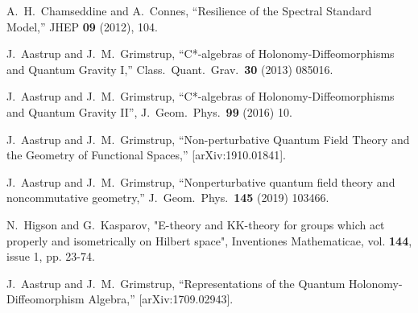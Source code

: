 \documentclass[letterpaper,11pt]{article}
\begin{document}
\begin{thebibliography}{99}
A.~H.~Chamseddine and A.~Connes,
``Resilience of the Spectral Standard Model,''
JHEP \textbf{09} (2012), 104.



  J.~Aastrup and J.~M.~Grimstrup,
  ``C*-algebras of Holonomy-Diffeomorphisms and Quantum Gravity I,''
  Class.\ Quant.\ Grav.\  {\bf 30} (2013) 085016.



  
 

  J.~Aastrup and J.~M.~Grimstrup,
  ``C*-algebras of Holonomy-Diffeomorphisms and Quantum Gravity II'',
   J.\ Geom.\ Phys.\  {\bf 99} (2016) 10.













J.~Aastrup and J.~M.~Grimstrup,
``Non-perturbative Quantum Field Theory and the Geometry of Functional Spaces,''
[arXiv:1910.01841].




  J.~Aastrup and J.~M.~Grimstrup,
  ``Nonperturbative quantum field theory and noncommutative geometry,''
  J.\ Geom.\ Phys.\  {\bf 145} (2019) 103466.




  
N.~Higson and G.~Kasparov, "E-theory and KK-theory for groups which act properly and isometrically on Hilbert space", 
Inventiones Mathematicae, vol. {\bf 144}, issue 1, pp. 23-74.






  J.~Aastrup and J.~M.~Grimstrup,
  ``Representations of the Quantum Holonomy-Diffeomorphism Algebra,''
  [arXiv:1709.02943].






\end{thebibliography}
\end{document}
